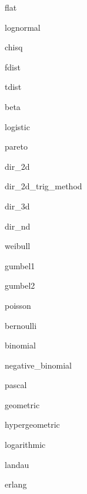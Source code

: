 \begin{methoddesc}{flat}{}
\end{methoddesc}
\begin{methoddesc}{lognormal}{}
\end{methoddesc}
\begin{methoddesc}{chisq}{}
\end{methoddesc}
\begin{methoddesc}{fdist}{}
\end{methoddesc}
\begin{methoddesc}{tdist}{}
\end{methoddesc}
\begin{methoddesc}{beta}{}
\end{methoddesc}
\begin{methoddesc}{logistic}{}
\end{methoddesc}
\begin{methoddesc}{pareto}{}
\end{methoddesc}
\begin{methoddesc}{dir\_2d}{}
\end{methoddesc}
\begin{methoddesc}{dir\_2d\_trig\_method}{}
\end{methoddesc}
\begin{methoddesc}{dir\_3d}{}
\end{methoddesc}
\begin{methoddesc}{dir\_nd}{}
\end{methoddesc}
\begin{methoddesc}{weibull}{}
\end{methoddesc}
\begin{methoddesc}{gumbel1}{}
\end{methoddesc}
\begin{methoddesc}{gumbel2}{}
\end{methoddesc}
\begin{methoddesc}{poisson}{}
\end{methoddesc}
\begin{methoddesc}{bernoulli}{}
\end{methoddesc}
\begin{methoddesc}{binomial}{}
\end{methoddesc}
\begin{methoddesc}{negative\_binomial}{}
\end{methoddesc}
\begin{methoddesc}{pascal}{}
\end{methoddesc}
\begin{methoddesc}{geometric}{}
\end{methoddesc}
\begin{methoddesc}{hypergeometric}{}
\end{methoddesc}
\begin{methoddesc}{logarithmic}{}
\end{methoddesc}
\begin{methoddesc}{landau}{}
\end{methoddesc}
\begin{methoddesc}{erlang}{}
\end{methoddesc}


